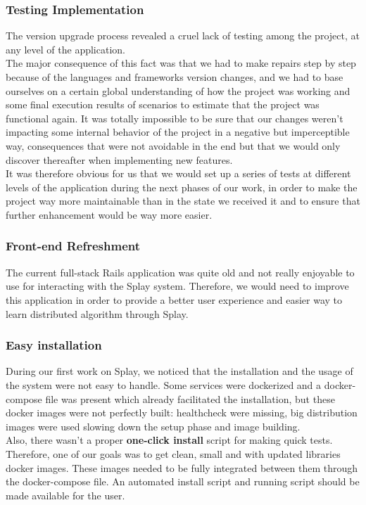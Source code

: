 \documentclass{eplmastersthesis}
\begin{document}
        \subsubsection{Testing Implementation}

          The version upgrade process revealed a cruel lack of testing among
          the project, at any level of the application.\\
          The major consequence of this fact was that we had to make repairs
          step by step because of the languages and frameworks version changes,
          and we had to base ourselves on a certain global understanding of how
          the project was working and some final execution results of scenarios
          to estimate that the project was functional again. It was totally
          impossible to be sure that our changes weren't impacting some internal
          behavior of the project in a negative but imperceptible way,
          consequences that were not avoidable in the end but that we would
          only discover thereafter when implementing new features.\\
          It was therefore obvious for us that we would set up a series of tests
          at different levels of the application during the next phases of our
          work, in order to make the project way more maintainable than in the
          state we received it and to ensure that further enhancement would
          be way more easier.

        \subsubsection{Front-end Refreshment}

          The current full-stack Rails application was quite old and not
          really enjoyable to use for interacting with the Splay system.
          Therefore, we would need to improve this application in order to
          provide a better user experience and easier way to learn distributed
          algorithm through Splay.

        \subsubsection{Easy installation}

          During our first work on Splay, we noticed that the installation and the
          usage of the system were not easy to handle. Some services were dockerized
          and a docker-compose file was present which already facilitated the
          installation, but these docker images were not perfectly built:
          healthcheck were missing, big distribution images were used slowing down
          the setup phase and image building.\\
          Also, there wasn't a proper \textbf{one-click install} script for
          making quick tests.\\
          Therefore, one of our goals was to get clean, small and with updated
          libraries docker images. These images needed to be fully integrated
          between them through the docker-compose file. An automated install
          script and running script should be made available for the user.
\end{document}
